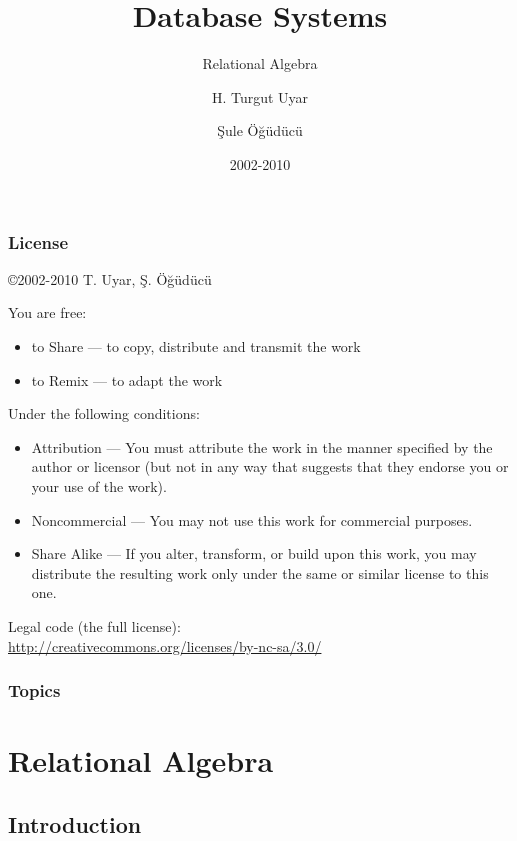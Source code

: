 \documentclass[dvipsnames]{beamer}
\title{Database Systems}
\subtitle{Relational Algebra}
\author{H. Turgut Uyar \and Şule Öğüdücü}
\date{2002-2010}
\theoremstyle{plain}
\begin{document}
\begin{frame}
  \titlepage
\end{frame}

\begin{frame}
  \frametitle{License}

  \hfill
  \copyright 2002-2010 T. Uyar, Ş. Öğüdücü

  \vfill
  \begin{tiny}
    You are free:
    \begin{itemize}
      \item to Share — to copy, distribute and transmit the work
      \item to Remix — to adapt the work
    \end{itemize}

    Under the following conditions:
    \begin{itemize}
      \item Attribution — You must attribute the work in the manner specified by
        the author or licensor (but not in any way that suggests that they
        endorse you or your use of the work).

      \item Noncommercial — You may not use this work for commercial purposes.

      \item Share Alike — If you alter, transform, or build upon this work, you
        may distribute the resulting work only under the same or similar license
        to this one.
    \end{itemize}
  \end{tiny}

  \vfill
  Legal code (the full license):\\
  \url{http://creativecommons.org/licenses/by-nc-sa/3.0/}
\end{frame}

\begin{frame}
  \frametitle{Topics}
  \tableofcontents
\end{frame}

\lstset{language=Leap}

\section{Relational Algebra}

\subsection{Introduction}
\end{document}
